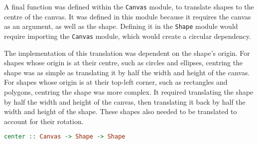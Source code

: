\documentclass[../main.tex]{subfiles}
\begin{document}
        A final function was defined within the \texttt{Canvas} module, to translate
            shapes to the centre of the canvas.
        It was defined in this module because it requires the canvas as an argument, as
            well as the shape.
        Defining it in the \texttt{Shape} module would require importing the
            \texttt{Canvas} module, which would create a circular dependency.

        The implementation of this translation was dependent on the shape's origin.
        For shapes whose origin is at their centre, such as circles and ellipses,
            centring the shape was as simple as translating it by half the width and height
            of the canvas.
        For shapes whose origin is at their top-left corner, such as rectangles and
            polygons, centring the shape was more complex.
        It required translating the shape by half the width and height of the canvas,
            then translating it back by half the width and height of the shape.
        These shapes also needed to be translated to account for their rotation.

        \begin{lstlisting}[language={Haskell}, label={lst:centre}, caption={The \texttt{center} 
            function.}]
center :: Canvas -> Shape -> Shape\end{lstlisting}
\end{document}
